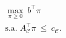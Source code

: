 \documentclass[preview]{standalone}
\begin{document}
\begin{align*}
\max_{\pi\ge 0}\ b^\top \pi\\\text{s.a.}\; A_{\mathcal{C}}^\top \pi \ \le\ c_{\mathcal{C}}.
\end{align*}
\end{document}
